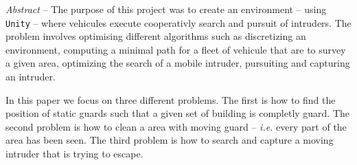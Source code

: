 \begin{bfseries}
\emph{Abstract} -- 
The purpose of this project was to create an environment -- using \texttt{Unity} -- where vehicules execute cooperativly search and pursuit of intruders. The problem involves optimising different algorithms such as discretizing an environment, computing a minimal path for a fleet of vehicule that are to survey a given area, optimizing the search of a mobile intruder, pursuiting and capturing an intruder.

In this paper we focus on three different problems. The first is how to find the position of static guards such that a given set of building is completly guard. The second problem is how to clean a area with moving guard -- \emph{i.e.} every part of the area has been seen. The third problem is how to search and capture a moving intruder that is trying to escape.
\end{bfseries}

